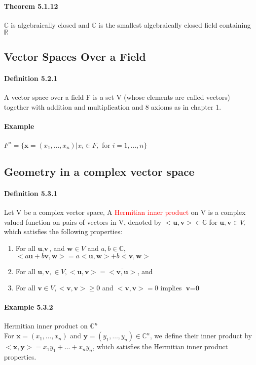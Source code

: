 \documentclass[11pt]{article}
\newcommand{\tb}[1]{\textbf{#1}}
\newcommand{\real}[0]{\mathbb{R}}
\newcommand{\mc}[0]{\mathbb{C}}
\newcommand{\vx}[0]{\tb{x}}
\newcommand{\vy}[0]{\tb{y}}
\newcommand{\vo}[0]{\tb{0}}
\newcommand{\vu}[0]{\tb{u}}
\newcommand{\vw}[0]{\tb{w}}
\newcommand{\vv}[0]{\tb{v}}
\begin{document}
{\paragraph{Theorem 5.1.12} $\mc$ is algebraically closed and $\mc$ is the smallest algebraically closed field containing $\real$
\subsection{Vector Spaces Over a Field}
\paragraph{Definition 5.2.1} A vector space over a field F is a set V (whose elements are called vectors) together with addition and multiplication and 8 axioms as in chapter 1.
\paragraph{Example} $F^n = \{\vx = (x_1, \hdots, x_n) | x_i\in F,$ for $i = 1,\hdots,n\}$

\subsection{Geometry in a complex vector space}
\paragraph{Definition 5.3.1} Let V be a complex vector space, A \textcolor{red}{Hermitian inner product} on V is a complex valued function on pairs of vectors in V, denoted by $<\vu, \vv> \in \mc$ for $\vu, \vv \in V$, which satisfies the following properties:
\begin{enumerate}
	\item For all $\vu, \vv$, and $\vw \in V$ and $a,b\in \mc$, $<a\vu + b\vv, \vw> = a<\vu,\vw> + b<\vv, \vw>$
	\item For all $\vu, \vv, \in V, <\vu, \vv> = \overline{<\vv,\vu>}$, and
	\item For all $\vv \in V, <\vv, \vv> \geq 0$ and $<\vv, \vv> = 0$ implies $\vv = \vo$
\end{enumerate}
\paragraph{Example 5.3.2} Hermitian inner product on $\mc^n$\\
For $\vx = (x_1, \hdots, x_n)$ and $\vy = (y_1, \hdots, y_n) \in \mc^n$, we define their inner product by $<\vx, \vy> = x_1\bar{y_1} + \hdots + x_n\bar{y_n}$, which satisfies the Hermitian inner product properties.
}
\end{document}
